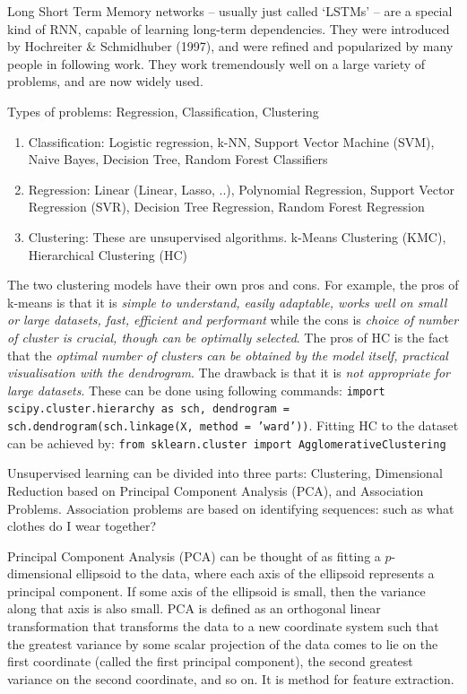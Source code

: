 \documentclass[11pt]{article}
\begin{document}
Long Short Term Memory networks – usually just called `LSTMs' – are a special kind of RNN, 
capable of learning long-term dependencies. 
They were introduced by Hochreiter \& Schmidhuber (1997), 
and were refined and popularized by many people in following work.
They work tremendously well on a large variety of problems, and are now widely used.




Types of problems: Regression, Classification, Clustering 

\begin{enumerate}
\item Classification: Logistic regression, k-NN, Support Vector Machine (SVM), Naive Bayes, Decision Tree, Random Forest Classifiers
\item Regression: Linear (Linear, Lasso, ..), Polynomial Regression, Support Vector Regression (SVR), Decision Tree Regression, Random Forest Regression
\item Clustering: These are unsupervised algorithms. k-Means Clustering (KMC), Hierarchical Clustering (HC)
\end{enumerate}

The two clustering models have their own pros and cons. For example, the pros of k-means is that it is \emph{simple to understand, easily adaptable, works well on small or large datasets, fast, efficient and performant}
while the cons is \emph{choice of number of cluster is crucial, though can be optimally selected}.
The pros of HC is the fact that the \emph{optimal number of clusters can be obtained by the 
model itself, practical visualisation with the dendrogram}. The drawback is that it is \emph{not appropriate for large datasets}. 
These can be done using following commands: \texttt{import scipy.cluster.hierarchy as sch, dendrogram = sch.dendrogram(sch.linkage(X, method = 'ward'))}. 
Fitting HC to the dataset can be achieved by: \texttt{from sklearn.cluster import AgglomerativeClustering}



Unsupervised learning can be divided into three parts: Clustering, Dimensional Reduction based on Principal Component Analysis (PCA), and Association Problems. 
Association problems are based on identifying sequences: such as what clothes do I wear together?


Principal Component Analysis (PCA) can be 
thought of as fitting a $p$-dimensional ellipsoid to the data, 
where each axis of the ellipsoid represents a principal component. 
If some axis of the ellipsoid is small, then the variance along that axis is also small.
PCA is defined as an orthogonal linear transformation that transforms the data to a 
new coordinate system such that the greatest variance by some scalar projection of the 
data comes to lie on the first coordinate (called the first principal component), the second greatest variance on the second coordinate, and so on. 
It is method for feature extraction. 
\end{document}

